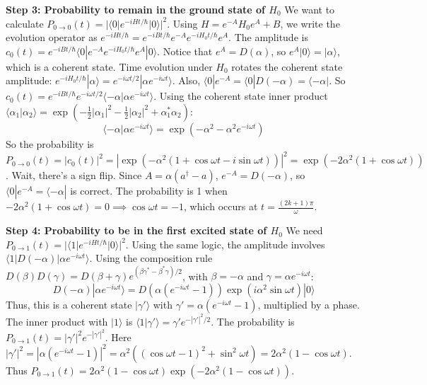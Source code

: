 \begin{solution}
\textbf{Step 3: Probability to remain in the ground state of $H_0$}
We want to calculate $P_{0 \to 0}(t) = | \langle 0 | e^{-iHt/\hbar} | 0 \rangle |^2$.
Using $H = e^{-A} H_0 e^A + B$, we write the evolution operator as $e^{-iHt/\hbar} = e^{-iBt/\hbar} e^{-A} e^{-iH_0t/\hbar} e^A$.
The amplitude is $c_0(t) = e^{-iBt/\hbar} \langle 0 | e^{-A} e^{-iH_0t/\hbar} e^A | 0 \rangle$.
Notice that $e^A = D(\alpha)$, so $e^A |0\rangle = |\alpha\rangle$, which is a coherent state.
Time evolution under $H_0$ rotates the coherent state amplitude: $e^{-iH_0t/\hbar} |\alpha\rangle = e^{-i\omega t/2} |\alpha e^{-i\omega t}\rangle$.
Also, $\langle 0 | e^{-A} = \langle 0 | D(-\alpha) = \langle -\alpha |$.
So $c_0(t) = e^{-iBt/\hbar} e^{-i\omega t/2} \langle -\alpha | \alpha e^{-i\omega t} \rangle$.
Using the coherent state inner product $\langle \alpha_1 | \alpha_2 \rangle = \exp\left( -\frac{1}{2}|\alpha_1|^2 - \frac{1}{2}|\alpha_2|^2 + \alpha_1^* \alpha_2 \right)$:
\[ \langle -\alpha | \alpha e^{-i\omega t} \rangle = \exp\left( -\alpha^2 - \alpha^2 e^{-i\omega t} \right) \]
So the probability is $P_{0\to 0}(t) = |c_0(t)|^2 = \left| \exp\left( -\alpha^2 (1 + \cos\omega t - i \sin\omega t) \right) \right|^2 = \exp\left( -2\alpha^2 (1 + \cos\omega t) \right)$.
Wait, there's a sign flip. Since $A = \alpha(a^\dagger - a)$, $e^{-A} = D(-\alpha)$, so $\langle 0 | e^{-A} = \langle -\alpha |$ is correct.
The probability is 1 when $-2\alpha^2(1 + \cos\omega t) = 0 \implies \cos\omega t = -1$, which occurs at $t = \frac{(2k+1)\pi}{\omega}$.

\textbf{Step 4: Probability to be in the first excited state of $H_0$}
We need $P_{0 \to 1}(t) = | \langle 1 | e^{-iHt/\hbar} | 0 \rangle |^2$.
Using the same logic, the amplitude involves $\langle 1 | D(-\alpha) | \alpha e^{-i\omega t} \rangle$.
Using the composition rule $D(\beta)D(\gamma) = D(\beta+\gamma) e^{(\beta\gamma^* - \beta^*\gamma)/2}$, with $\beta = -\alpha$ and $\gamma = \alpha e^{-i\omega t}$:
\[ D(-\alpha) |\alpha e^{-i\omega t}\rangle = D(\alpha(e^{-i\omega t}-1)) \exp( i\alpha^2 \sin\omega t ) | 0 \rangle \]
Thus, this is a coherent state $|\gamma'\rangle$ with $\gamma' = \alpha(e^{-i\omega t}-1)$, multiplied by a phase.
The inner product with $|1\rangle$ is $\langle 1 | \gamma' \rangle = \gamma' e^{-|\gamma'|^2/2}$.
The probability is $P_{0\to 1}(t) = |\gamma'|^2 e^{-|\gamma'|^2}$.
Here $|\gamma'|^2 = |\alpha(e^{-i\omega t}-1)|^2 = \alpha^2 ( (\cos\omega t - 1)^2 + \sin^2\omega t ) = 2\alpha^2 (1 - \cos\omega t)$.
Thus $P_{0\to 1}(t) = 2\alpha^2 (1 - \cos\omega t) \exp\left( -2\alpha^2 (1 - \cos\omega t) \right)$.


\end{solution}
